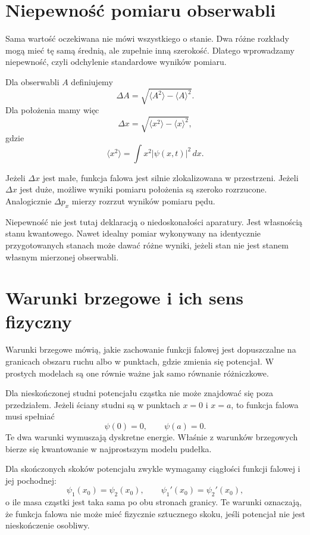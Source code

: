 \section{Niepewność pomiaru obserwabli}

Sama wartość oczekiwana nie mówi wszystkiego o stanie. Dwa różne rozkłady mogą mieć tę samą średnią, ale zupełnie inną szerokość. Dlatego wprowadzamy niepewność, czyli odchylenie standardowe wyników pomiaru.

Dla obserwabli \(A\) definiujemy
\begin{equation}
    \Delta A=\sqrt{\langle A^2\rangle-\langle A\rangle^2}.
\end{equation}
Dla położenia mamy więc
\begin{equation}
    \Delta x=\sqrt{\langle x^2\rangle-\langle x\rangle^2},
\end{equation}
gdzie
\[
    \langle x^2\rangle=\int x^2|\psi(x,t)|^2\,dx.
\]

Jeżeli \(\Delta x\) jest małe, funkcja falowa jest silnie zlokalizowana w przestrzeni. Jeżeli \(\Delta x\) jest duże, możliwe wyniki pomiaru położenia są szeroko rozrzucone. Analogicznie \(\Delta p_x\) mierzy rozrzut wyników pomiaru pędu.

Niepewność nie jest tutaj deklaracją o niedoskonałości aparatury. Jest własnością stanu kwantowego. Nawet idealny pomiar wykonywany na identycznie przygotowanych stanach może dawać różne wyniki, jeżeli stan nie jest stanem własnym mierzonej obserwabli.

\section{Warunki brzegowe i ich sens fizyczny}

Warunki brzegowe mówią, jakie zachowanie funkcji falowej jest dopuszczalne na granicach obszaru ruchu albo w punktach, gdzie zmienia się potencjał. W prostych modelach są one równie ważne jak samo równanie różniczkowe.

Dla nieskończonej studni potencjału cząstka nie może znajdować się poza przedziałem. Jeżeli ściany studni są w punktach \(x=0\) i \(x=a\), to funkcja falowa musi spełniać
\begin{equation}
    \psi(0)=0,
    \qquad
    \psi(a)=0.
\end{equation}
Te dwa warunki wymuszają dyskretne energie. Właśnie z warunków brzegowych bierze się kwantowanie w najprostszym modelu pudełka.

Dla skończonych skoków potencjału zwykle wymagamy ciągłości funkcji falowej i jej pochodnej:
\begin{equation}
    \psi_1(x_0)=\psi_2(x_0),
    \qquad
    \psi_1'(x_0)=\psi_2'(x_0),
\end{equation}
o ile masa cząstki jest taka sama po obu stronach granicy. Te warunki oznaczają, że funkcja falowa nie może mieć fizycznie sztucznego skoku, jeśli potencjał nie jest nieskończenie osobliwy.

